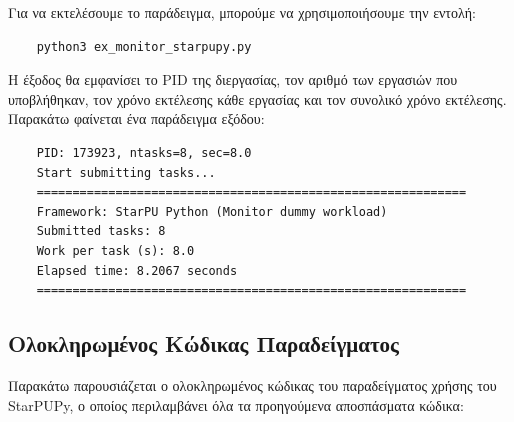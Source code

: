 Για να εκτελέσουμε το παράδειγμα, μπορούμε να χρησιμοποιήσουμε την εντολή:

\begin{verbatim}
    python3 ex_monitor_starpupy.py
\end{verbatim}

Η έξοδος θα εμφανίσει το PID της διεργασίας, τον αριθμό των εργασιών που υποβλήθηκαν, τον χρόνο εκτέλεσης κάθε εργασίας και τον συνολικό χρόνο εκτέλεσης. Παρακάτω φαίνεται ένα παράδειγμα εξόδου:

\begin{verbatim}
    PID: 173923, ntasks=8, sec=8.0
    Start submitting tasks...
    ============================================================
    Framework: StarPU Python (Monitor dummy workload)
    Submitted tasks: 8
    Work per task (s): 8.0
    Elapsed time: 8.2067 seconds
    ============================================================
\end{verbatim}

\subsection{Ολοκληρωμένος Κώδικας Παραδείγματος}

Παρακάτω παρουσιάζεται ο ολοκληρωμένος κώδικας του παραδείγματος χρήσης του StarPUPy, ο οποίος περιλαμβάνει όλα τα προηγούμενα αποσπάσματα κώδικα:

